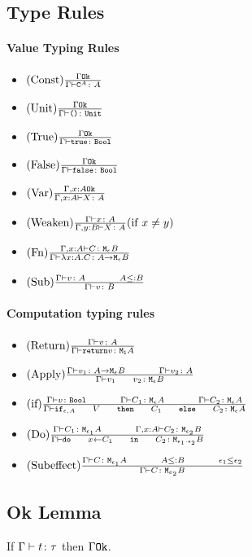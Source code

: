 {    \subsection{Type Rules}
    \paragraph{Value Typing Rules}
    \begin{itemize}
        \item $(\text{Const}) \frac{\Gamma \texttt{Ok}}{\Gamma \vdash \texttt{C}^{A} \colon A}$
        \item $(\text{Unit}) \frac{\Gamma \texttt{Ok}}{\Gamma \vdash \texttt{()} \colon \texttt{Unit}}$
        \item $(\text{True}) \frac{\Gamma \texttt{Ok}}{\Gamma \vdash \texttt{true} \colon \texttt{Bool}}$
        \item $(\text{False}) \frac{\Gamma \texttt{Ok}}{\Gamma \vdash \texttt{false} \colon \texttt{Bool}}$
        \item $(\text{Var}) \frac{\Gamma, x: A \texttt{Ok}}{\Gamma, x: A \vdash X \colon A}$
        \item $(\text{Weaken}) \frac{\Gamma \vdash x \colon A}{\Gamma, y: B \vdash X \colon A}(\text{if } x \neq y)$
        \item $(\text{Fn}) \frac{\Gamma, x: A \vdash C \colon \texttt{M}_{\epsilon}{B}}{\Gamma \vdash \lambda x : A. C \colon A \rightarrow \texttt{M}_{\epsilon}{B}}$
        \item $\treerule{Sub}{\typerelation{\G}{v}{A}\s\s A \subtype B}{\typerelation{\G}{v}{B}}$
    \end{itemize}
    \paragraph{Computation typing rules}
    \begin{itemize}
        \item $(\text{Return}) \frac{\Gamma \vdash v \colon A}{\Gamma \vdash \texttt{return} v \colon \texttt{M}_{\texttt{1}}{A}}$
        \item $\treerule{Apply}{\typerelation{\G}{v_1}{\aeb}\s\s\typerelation{\G}{v_2}{A}}{\typerelation{\G}{\apply{v_1}{v_2}}{\meb}}$
        \item $\treerule{if}{\typerelation{\G}{v}{\B} \s\s \typerelation{\G}{C_1}{\mea}\s\s\typerelation{\G}{C_2}{\mea}}{\typerelation{\G}{\ifthenelse{\e}{A}{V}{C_1}{C_2}}{\mea}}$
        \item $\treerule{Do}{\typerelation{\G}{C_1}{\M{\e_1}{A}} \s\s \typerelation{\gax}{C_2}{\M{\e_2}{B}}}{\typerelation{\G}{\doin{x}{C_1}{C_2}}{\M{\e_1 \dot \e_2}{B}}}$
        \item $\treerule{Subeffect}{\typerelation{\G}{C}{\M{\e_1}{A}}\s\s A \subtype B \s\s \e_1 \subeffect \e_2}{\typerelation{\G}{C}{\M{e_2}{B}}}$
    \end{itemize}

    \subsection{Ok Lemma}
    If $\Gamma \vdash t \colon \tau$ then $\Gamma \texttt{Ok}$.
}
